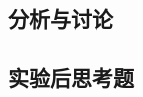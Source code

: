 \documentclass[dvipsnames, svgnames,a4paper,11pt]{article}
\begin{document}
\subsection{分析与讨论}

\subsection{实验后思考题}


\clearpage
%
%


\appendix
\appendixpage
\addappheadtotoc
%
%
	
	

\end{document}
